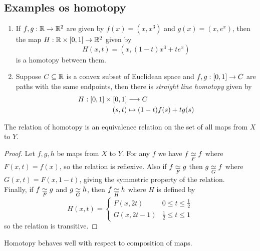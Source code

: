 \subsection*{Examples os homotopy}
\begin{enumerate}
    \item If $f,g : \mathbb{R} \rightarrow \mathbb{R}^2$ are given by $f(x) = (x, x^3)$ and $g(x) = (x, e^x)$, then the map $H : \mathbb{R} \times [0,1] \rightarrow \mathbb{R}^2$ given by 
    \[
        H (x,t) = \left(x, (1-t)x^3 + te^x\right) 
    \]
    is a homotopy between them.
    \item Suppose $C \subseteq \mathbb{R}$ is a convex subset of Euclidean space and $f,g : [0,1] \rightarrow C$ are paths with the same endpoints, then there is \textit{straight line homotopy} given by
    \begin{align*}
        H : [0,1] \times [0,1] & \longrightarrow C \\
        (s,t) & \mapsto (1-t) f(s) + tg(s)
    \end{align*}


\end{enumerate}

\begin{lem}
    The relation of homotopy is an equivalence relation on the set of all maps from $X$ to $Y$.
\end{lem}
\begin{proof}
    Let $f,g,h$ be maps from $X$ to $Y$. For any $f$ we have $f \underset{F}{\simeq} f$ where $F(x,t) = f(x)$, so the relation is reflexive. Also if $f \underset{F}{\simeq} g$ then $g \underset{G}{\simeq} f$ where $G(x,t) = F(x, 1-t)$, giving the symmetric property of the relation.
    \\
    Finally, if $f \underset{F}{\simeq} g$ and $g \underset{G}{\simeq} h$, then $f \underset{H}{\simeq} h$ where $H$ is defined by
    \begin{equation*}
        H(x,t) = \begin{cases}
            F(x, 2t) & 0 \le t \le \frac12 \\
            G(x, 2t - 1) & \frac12 \le t \le 1
        \end{cases}
    \end{equation*}
    so the relation is transitive.
\end{proof}

\begin{lem}\label{lem:hom-top-comp}
    Homotopy behaves well with respect to composition of maps.
\end{lem}

